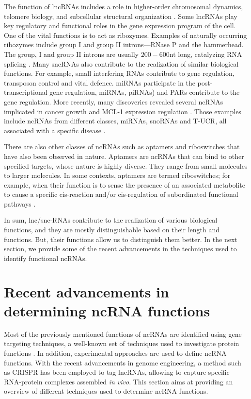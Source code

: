 The function of \acp{lncRNA} includes a role in higher-order chromosomal dynamics, telomere biology, and subcellular structural organization \cite{bergmann2014long,cusanelli2014telomeric}. Some \acp{lncRNA} play key regulatory and functional roles in the gene expression program of the cell. One of the vital functions is to act as ribozymes. Examples of naturally occurring ribozymes include group I and group II introns---RNase P and the hammerhead. The group, I and group II introns are usually $200-600$nt long, catalyzing \ac{RNA} splicing \cite{gilbert_origin_1986}. Many \acp{sncRNA} also contribute to the realization of similar biological functions. For example, small interfering \acp{RNA} contribute to gene regulation, transposon control and vital defence. \acp{miRNA} participate in the post-transcriptional gene regulation, \acp{miRNA}, \acp{piRNA}) and \acp{PAR} contribute to the gene regulation. More recently,  many discoveries revealed several \acp{ncRNA} implicated in cancer growth and MCL-1 expression regulation \cite{wang2021circpvt1, santosh2015non}. Those examples include \acp{ncRNA} from different classes, \acp{miRNA}, \acp{snoRNA} and T-UCR, all associated with a specific disease \cite{santosh2015non,esteller2011non}. 

There are also other classes of \acp{ncRNA} such as aptamers and riboswitches that have also been observed in nature. Aptamers are \acp{ncRNA} that can bind to other specified targets, whose nature is highly diverse. They range from small molecules to larger molecules. In some contexts, aptamers are termed riboswitches; for example, when their function is to sense the presence of an associated metabolite to cause a specific cis-reaction and/or cis-regulation of subordinated functional pathways \cite{winkler2003genetic}. 

In sum, lnc/snc-RNAs contribute to the realization of various biological functions, and they are mostly distinguishable based on their length and functions. But, their functions allow us to distinguish them better. In the next section, we provide some of the recent advancements in the techniques used to identify functional \acp{ncRNA}.

\section{Recent advancements in determining ncRNA functions}
\label{sec:advancements}
Most of the previously mentioned functions of \acp{ncRNA} are identified using gene targeting techniques, a well-known set of techniques used to investigate protein functions \cite{sauvageau2013multiple}. In addition, experimental approaches are used to define \ac{ncRNA} functions. With the recent advancements in genome engineering, a method such as \ac{CRISPR} has been employed to tag \acp{lncRNA}, allowing to capture specific \ac{RNA}-protein complexes assembled \textit{in vivo}. This section aims at providing an overview of different techniques used to determine \ac{ncRNA} functions.

